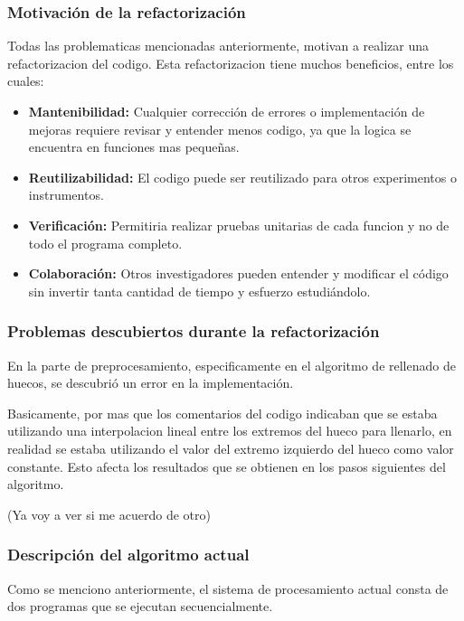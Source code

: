 \documentclass[12pt,a4paper]{article}
\begin{document}
\subsubsection{Motivación de la refactorización}

Todas las problematicas mencionadas anteriormente, motivan a realizar una refactorizacion del codigo. Esta refactorizacion tiene muchos beneficios, entre los cuales:

\begin{itemize}

\item \textbf{Mantenibilidad:} Cualquier corrección de errores o implementación de mejoras requiere revisar y entender menos codigo, ya que la logica se encuentra en funciones mas pequeñas.

\item \textbf{Reutilizabilidad:} El codigo puede ser reutilizado para otros experimentos o instrumentos.

\item \textbf{Verificación:} Permitiria realizar pruebas unitarias de cada funcion y no de todo el programa completo.

\item \textbf{Colaboración:} Otros investigadores pueden entender y modificar el código sin
invertir tanta cantidad de tiempo y esfuerzo estudiándolo.

\end{itemize}

\subsubsection{Problemas descubiertos durante la refactorización}

En la parte de preprocesamiento, especificamente en el algoritmo de rellenado de huecos, se descubrió un error en la implementación.

Basicamente, por mas que los comentarios del codigo indicaban que se estaba utilizando una interpolacion lineal entre los extremos del hueco para llenarlo, en realidad se estaba utilizando el valor del extremo izquierdo del hueco como valor constante. Esto afecta los resultados que se obtienen en los pasos siguientes del algoritmo.

(Ya voy a ver si me acuerdo de otro)

\subsubsection{Descripción del algoritmo actual}
Como se menciono anteriormente, el sistema de procesamiento actual consta de dos programas que se ejecutan
secuencialmente.
\end{document}
